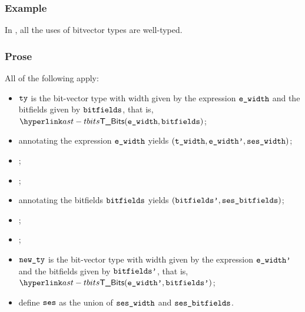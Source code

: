 \subsubsection{Example}
In , all the uses of bitvector types are well-typed.

\subsubsection{Prose}
All of the following apply:
\begin{itemize}
  \item $\texttt{ty}$ is the bit-vector type with width given by the expression
    $\texttt{e\_width}$ and the bitfields given by $\texttt{bitfields}$, that is, $\TBits(\ewidth, \bitfields)$;
  \item annotating the expression $\texttt{e\_width}$ yields $(\texttt{t\_width}, \texttt{e\_width'}, \texttt{ses\_width})$\ProseOrTypeError;
  \item \Prosecheckstaticallyevaluable{\seswidth};
  \item \Prosecheckconstrainedinteger{$\tenv$}{$\twidth$};
  \item annotating the bitfields $\texttt{bitfields}$ yields $(\texttt{bitfields'}, \texttt{ses\_bitfields})$\ProseOrTypeError;
  \item \Prosestaticeval{$\tenv$}{$\ewidthp$}{$\lint(\vwidth)$};
  \item \Prosecheckcommonbitfieldsalign{$\tenv$}{$\bitfieldsp$}{$\vwidth$}\ProseOrTypeError;
  \item $\texttt{new\_ty}$ is the bit-vector type with width given by the expression
    $\ewidthp$ and the bitfields given by $\bitfieldsp$, that is, $\TBits(\ewidthp, \bitfieldsp)$;
  \item define $\texttt{ses}$ as the union of $\texttt{ses\_width}$ and $\texttt{ses\_bitfields}$.
\end{itemize}

